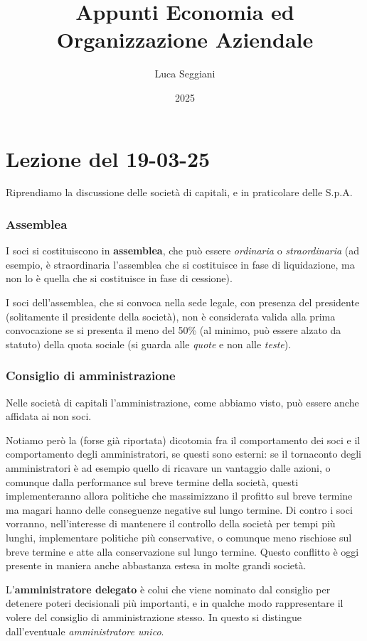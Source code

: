 \documentclass[a4paper,11pt]{article}
\title{Appunti Economia ed Organizzazione Aziendale}
\author{Luca Seggiani}
\date{2025}
\begin{document}
\section{Lezione del 19-03-25}

\thispagestyle{empty}
\pagestyle{fancy}

Riprendiamo la discussione delle società di capitali, e in praticolare delle S.p.A.

\subsubsection{Assemblea}
I soci si costituiscono in \textbf{assemblea}, che può essere \textit{ordinaria} o \textit{straordinaria} (ad esempio, è straordinaria l'assemblea che si costituisce in fase di liquidazione, ma non lo è quella che si costituisce in fase di cessione).

I soci dell'assemblea, che si convoca nella sede legale, con presenza del presidente (solitamente il presidente della società), non è considerata valida alla prima convocazione se si presenta il meno del 50\% (al minimo, può essere alzato da statuto) della quota sociale (si guarda alle \textit{quote} e non alle \textit{teste}).

\subsubsection{Consiglio di amministrazione}
Nelle società di capitali l'amministrazione, come abbiamo visto, può essere anche affidata ai non soci.

Notiamo però la (forse già riportata) dicotomia fra il comportamento dei soci e il comportamento degli amministratori, se questi sono esterni: se il tornaconto degli amministratori è ad esempio quello di ricavare un vantaggio dalle azioni, o comunque dalla performance sul breve termine della società, questi implementeranno allora politiche che massimizzano il profitto sul breve termine ma magari hanno delle conseguenze negative sul lungo termine.
Di contro i soci vorranno, nell'interesse di mantenere il controllo della società per tempi più lunghi, implementare politiche più conservative, o comunque meno rischiose sul breve termine e atte alla conservazione sul lungo termine.
Questo conflitto è oggi presente in maniera anche abbastanza estesa in molte grandi società.

L'\textbf{amministratore delegato} è colui che viene nominato dal consiglio per detenere poteri decisionali più importanti, e in qualche modo rappresentare il volere del consiglio di amministrazione stesso.
In questo si distingue dall'eventuale \textit{amministratore unico}.
\end{document}
